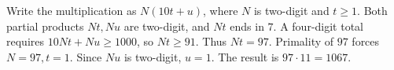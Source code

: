 Write the multiplication as $N(10t+u)$, where $N$ is two-digit and $t\ge1$. Both partial products $Nt,Nu$ are two-digit, and $Nt$ ends in $7$. A four-digit total requires $10Nt+Nu\ge1000$, so $Nt\ge91$. Thus $Nt=97$. Primality of $97$ forces $N=97,t=1$. Since $Nu$ is two-digit, $u=1$. The result is $97\cdot11=\boxed{1067}$.
